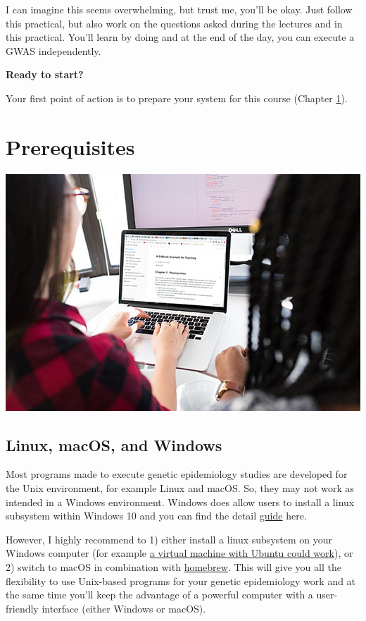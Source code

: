 \documentclass[
]{book}
\begin{document}
I can imagine this seems overwhelming, but trust me, you'll be okay. Just follow this practical, but also work on the questions asked during the lectures and in this practical. You'll learn by doing and at the end of the day, you can execute a GWAS independently.

\textbf{Ready to start?}

Your first point of action is to prepare your system for this course (Chapter \ref{prerequisites}).

\hypertarget{prerequisites}{%
\chapter{Prerequisites}\label{prerequisites}}

\includegraphics{./img/using_gitbook.jpeg}

\hypertarget{linux-macos-and-windows}{%
\section{Linux, macOS, and Windows}\label{linux-macos-and-windows}}

Most programs made to execute genetic epidemiology studies are developed for the Unix environment, for example Linux and macOS. So, they may not work as intended in a Windows environment. Windows does allow users to install a linux subsystem within Windows 10 and you can find the detail \href{https://docs.microsoft.com/en-us/windows/wsl/about}{guide} here.

However, I highly recommend to 1) either install a linux subsystem on your Windows computer (for example \href{https://blog.storagecraft.com/the-dead-simple-guide-to-installing-a-linux-virtual-machine-on-windows/}{a virtual machine with Ubuntu could work}), or 2) switch to macOS in combination with \href{https://brew.sh}{homebrew}. This will give you all the flexibility to use Unix-based programs for your genetic epidemiology work and at the same time you'll keep the advantage of a powerful computer with a user-friendly interface (either Windows or macOS).
\end{document}
